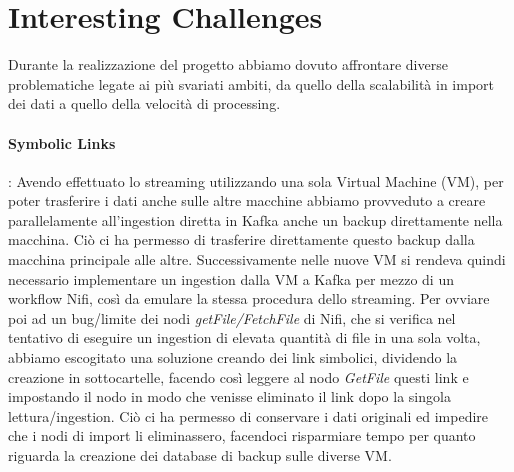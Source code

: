 \documentclass[fleqn,10pt]{SelfArx} %
\begin{document}
\section*{Interesting Challenges}
{\small
Durante la realizzazione del progetto abbiamo dovuto affrontare diverse problematiche legate ai più svariati ambiti, da quello della scalabilità in import dei dati a quello della velocità di processing.
\paragraph{Symbolic Links}: Avendo effettuato lo streaming utilizzando una sola Virtual Machine (VM), per poter trasferire i dati anche sulle altre macchine abbiamo provveduto a creare parallelamente all'ingestion diretta in Kafka anche un backup direttamente nella macchina. Ciò ci ha permesso di trasferire direttamente questo backup dalla macchina principale alle altre. Successivamente nelle nuove VM si rendeva quindi necessario implementare un ingestion dalla VM a Kafka per mezzo di un workflow Nifi, così da emulare la stessa procedura dello streaming. Per ovviare poi ad un bug/limite dei nodi \textit{getFile/FetchFile} di Nifi, che si verifica nel tentativo di eseguire un ingestion di elevata quantità di file in una sola volta, abbiamo escogitato una soluzione creando dei link simbolici, dividendo la creazione in sottocartelle, facendo così leggere al nodo \textit{GetFile} questi link e impostando il nodo in modo che venisse eliminato il link dopo la singola lettura/ingestion. Ciò ci ha permesso di conservare i dati originali ed impedire che i nodi di import li eliminassero, facendoci risparmiare tempo per quanto riguarda la creazione dei database di backup sulle diverse VM.
}
\end{document}
